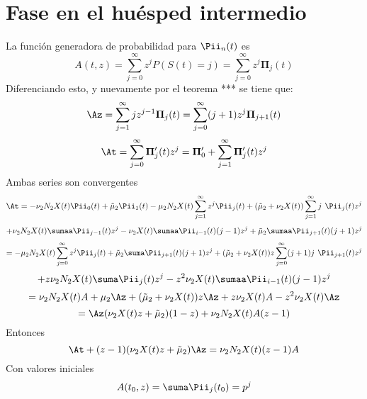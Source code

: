 \section{Fase en el huésped intermedio}
La función generadora de probabilidad para $ \Pii_n(t)$ es 
$$A(t,z)=\sum_{j=0}^\infty z^j P(S(t)=j)=\sum_{j=0}^\infty z^j \mathbf{\Pi}_j(t)$$
Diferenciando esto, y nuevamente por el teorema *** se tiene que: $$\Az=\sum_{j=1}^\infty j z^{j-1}\mathbf{\Pi}_j(t)=\sum_{j=0}^\infty (j+1)z^{j}\mathbf{\Pi}_{j+1}(t)$$ $$\At=\sum_{j=0}^\infty\mathbf{\Pi}'_j(t)z^j=\mathbf{\Pi}'_0+\sum_{j=1}^\infty \mathbf{\Pi}'_j(t)z^j$$
Ambas series son convergentes 
$$\At=-\nu_2N_2X(t)\Pii_0(t)+\tilde{\mu}_2\Pii_1(t)-\mu_2N_2X(t)\sum_{j=1}^\infty z^j\Pii_j(t)+(\tilde{\mu}_2+\nu_2X(t))\sum_{j=1}^{\infty}j\textbf{ }\Pii_j(t)z^j$$ 
$$+\nu_2N_2X(t)\sumaa\Pii_{j-1}(t)z^j-\nu_2X(t)\sumaa\Pii_{i-1}(t)(j-1)z^j+\tilde{\mu}_2\sumaa\Pii_{j+1}(t)(j+1)z^j $$
$$=-\mu_2N_2X(t)\sum_{j=0}^\infty z^j\Pii_j(t)+\tilde{\mu}_2\suma\Pii_{j+1}(t)(j+1)z^j+(\tilde{\mu}_2+\nu_2X(t))z\sum_{j=0}^{\infty}(j+1)j\textbf{ }\Pii_{j+1}(t)z^j$$ 
$$+z\nu_2N_2X(t)\suma\Pii_j(t)z^j-z^2\nu_2X(t)\sumaa\Pii_{i-1}(t)(j-1)z^j$$
$$=\nu_2N_2X(t)A+\mu_2\Az+(\tilde{\mu}_2+\nu_2X(t))z\Az+z\nu_2X(t)A-z^2\nu_2X(t)\Az$$
$$=\Az(\nu_2X(t)z+\tilde{\mu}_2)(1-z)+\nu_2N_2X(t)A(z-1)$$
Entonces 
$$\At+(z-1)(\nu_2X(t)z+\tilde{\mu}_2)\Az=\nu_2N_2X(t)(z-1)A$$
Con valores iniciales 
$$A(t_0,z)=\suma\Pii_j(t_0)=p^j$$